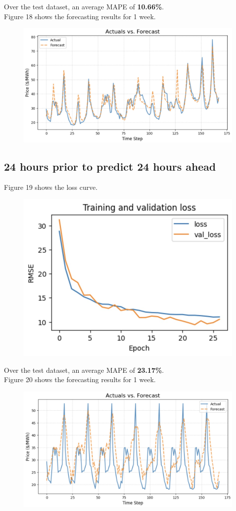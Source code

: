 \documentclass[9pt,a4paper,twoside]{rho}
\begin{document}
\noindent Over the test dataset, an average MAPE of \textbf{10.66\%}.\\

\noindent Figure 18 shows the forecasting results for 1 week.
\begin{figure}[H]
	\centering
	\includegraphics[width=0.8\columnwidth]{Figures/LSTM_24_1_Results.png}
\end{figure}

\subsection*{24 hours prior to predict 24 hours ahead}

\noindent Figure 19 shows the loss curve.
\begin{figure}[H]
	\centering
	\includegraphics[width=0.8\columnwidth]{Figures/LSTM_24_24_Learning.png}
\end{figure}

\noindent Over the test dataset, an average MAPE of \textbf{23.17\%}.\\

\noindent Figure 20 shows the forecasting results for 1 week.
\begin{figure}[H]
	\centering
	\includegraphics[width=0.8\columnwidth]{Figures/LSTM_24_24_Results.png}
\end{figure}
\end{document}
